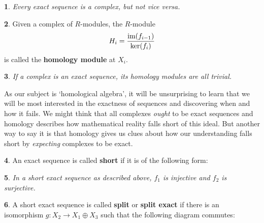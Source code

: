 \documentclass[oneside,english]{amsbook}
\numberwithin{section}{chapter}
\theoremstyle{plain}
\newtheorem{thm}{\protect\theoremname}
\theoremstyle{definition}
\newtheorem{defn}[thm]{\protect\definitionname}
\providecommand{\definitionname}{Definition}
\providecommand{\theoremname}{Theorem}
\newcommand{\im}{\text{\upshape{im}}}
\begin{document}
		\begin{thm}
			Every exact sequence is a complex, but not \textit{vice versa}.
		\end{thm}
		
		\begin{defn}
			Given a complex of $R$-modules, the $R$-module
			\[
				H_i = \frac{\im(f_{i-1})}{\ker(f_{i})}
			\]
			is called the \textbf{homology module} at $X_i$.
		\end{defn}
		
		\begin{thm}
			If a complex is an exact sequence, its homology modules are all trivial.
		\end{thm}
		
		As our subject is `homological algebra', it will be unsurprising to learn that we will be most interested in the exactness of sequences and discovering when and how it fails. We might think that all complexes \textit{ought} to be exact sequences and homology describes how mathematical reality falls short of this ideal. But another way to say it is that homology gives us clues about how our understanding falls short by \textit{expecting} complexes to be exact.
		
		\begin{defn}
			An exact sequence is called \textbf{short} if it is of the following form:
			\begin{center}
			\end{center}					
		\end{defn}
		
		\begin{thm}
			In a short exact sequence as described above, $f_1$ is injective and $f_{2}$ is surjective.

			\begin{center}
			\end{center}
			
		\end{thm}
		
		\begin{defn}
			A short exact sequence is called \textbf{split} or \textbf{split exact} if there is an isomorphism $g: X_2\to X_1\oplus X_3$ such that the following diagram commutes:
			
			\begin{center}
			\end{center}
			
		\end{defn}
		
\end{document}
